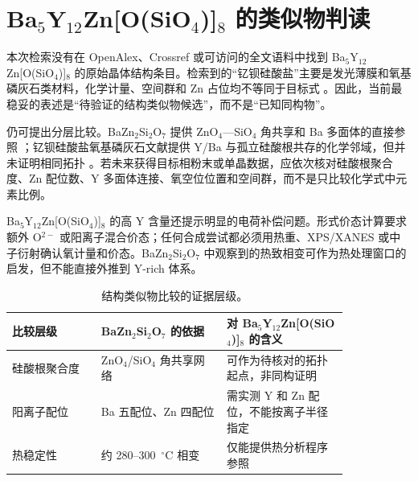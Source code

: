 \section{Ba$_5$Y$_{12}$Zn[O(SiO$_4$)]$_8$ 的类似物判读}

本次检索没有在 OpenAlex、Crossref 或可访问的全文语料中找到 Ba$_5$Y$_{12}$Zn[O(SiO$_4$)]$_8$ 的原始晶体结构条目。检索到的“钇钡硅酸盐”主要是发光薄膜和氧基磷灰石类材料，化学计量、空间群和 Zn 占位均不等同于目标式 \cite{gupta2021combustion,yang2021cyan}。因此，当前最稳妥的表述是“待验证的结构类似物候选”，而不是“已知同构物”。

仍可提出分层比较。BaZn$_2$Si$_2$O$_7$ 提供 ZnO$_4$—SiO$_4$ 角共享和 Ba 多面体的直接参照 \cite{lin1999phase,available2020materials,kaiser2002crystal}；钇钡硅酸盐氧基磷灰石文献提供 Y/Ba 与孤立硅酸根共存的化学邻域，但并未证明相同拓扑 \cite{gupta2021combustion,yang2021cyan,wei2013a}。若未来获得目标相粉末或单晶数据，应依次核对硅酸根聚合度、Zn 配位数、Y 多面体连接、氧空位位置和空间群，而不是只比较化学式中元素比例。

Ba$_5$Y$_{12}$Zn[O(SiO$_4$)]$_8$ 的高 Y 含量还提示明显的电荷补偿问题。形式价态计算要求额外 O$^{2-}$ 或阳离子混合价态；任何合成尝试都必须用热重、XPS\slash XANES 或中子衍射确认氧计量和价态。BaZn$_2$Si$_2$O$_7$ 中观察到的热致相变可作为热处理窗口的启发，但不能直接外推到 Y-rich 体系。

\begin{table}[t]
\centering
\caption{结构类似物比较的证据层级。}
\begin{tabular}{P{0.22\linewidth}P{0.31\linewidth}P{0.30\linewidth}}
\toprule
比较层级 & BaZn$_2$Si$_2$O$_7$ 的依据 & 对 Ba$_5$Y$_{12}$Zn[O(SiO$_4$)]$_8$ 的含义 \\
\midrule
硅酸根聚合度 & ZnO$_4$/SiO$_4$ 角共享网络 \cite{lin1999phase} & 可作为待核对的拓扑起点，非同构证明 \\
阳离子配位 & Ba 五配位、Zn 四配位 \cite{available2020materials} & 需实测 Y 和 Zn 配位，不能按离子半径指定 \\
热稳定性 & 约 280--300~$^\circ$C 相变 \cite{thieme2015ba1} & 仅能提供热分析程序参照 \\
\bottomrule
\end{tabular}
\end{table}
